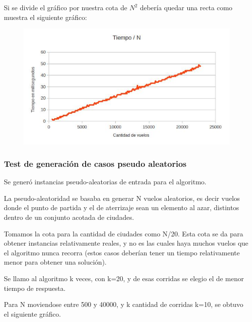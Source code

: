 Si se divide el gr\'afico por nuestra cota de $N^{2}$ deber\'ia quedar una recta como muestra el siguiente gr\'afico:

\begin{figure}[ht]
	\begin{minipage}[t]{\linewidth}
		\centering
		\includegraphics[width=\textwidth]{GraficoDeVuelosPeorCasoDivididoN.jpg}
	\end{minipage}	
\end{figure}

\newpage
\subsubsection{Test de generaci\'on de casos pseudo aleatorios}

Se gener\'o instancias pseudo-aleatorias de entrada para el algoritmo.

La pseudo-aleatoridad se basaba en generar N vuelos aleatorios, es decir vuelos donde el punto de partida y el de aterrizaje sean un elemento al azar, distintos dentro de un conjunto acotada de ciudades.

Tomamos la cota para la cantidad de ciudades como N/20. Esta cota se da para obtener instancias relativamente reales, y no es las cuales haya muchos vuelos que el algoritmo nunca recorra (estos casos deber\'ian tener un tiempo relativamente menor para obtener una soluci\'on).

Se llamo al algoritmo k veces, con k=20, y de esas corridas se elegio el de menor tiempo de respuesta.

Para N moviendose entre 500 y 40000, y k cantidad de corridas k=10, se obtuvo el siguiente gr\'afico.

